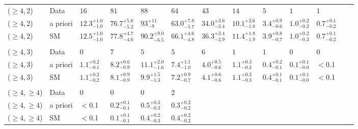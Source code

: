 \begin{table}[!t]
{\begin{tabular}{ lllllllllllll }
    ($\geq4$,\,2)
             & Data
             & $16$
             & $81$
             & $88$
             & $64$
             & $43$
             & $14$
             & $5$
             & $1$
             & $1$                                      \\
    ($\geq4$,\,2)
             & a priori
             & $12.3^{+1.0}_{-1.0}$
             & $76.7^{+5.6}_{-5.2}$
             & $93^{+11}_{-9}$
             & $63.0^{+7.8}_{-5.7}$
             & $34.0^{+3.6}_{-3.4}$
             & $10.1^{+2.6}_{-1.8}$
             & $3.4^{+0.9}_{-0.6}$
             & $1.0^{+0.2}_{-0.2}$
             & $0.7^{+0.1}_{-0.2}$                      \\
    ($\geq4$,\,2)
             & SM
             & $12.5^{+1.0}_{-1.0}$
             & $77.8^{+4.7}_{-4.6}$
             & $90.2^{+9.0}_{-6.5}$
             & $66.1^{+4.6}_{-4.8}$
             & $36.3^{+3.4}_{-2.9}$
             & $11.4^{+1.8}_{-1.9}$
             & $3.9^{+0.8}_{-0.7}$
             & $1.0^{+0.2}_{-0.3}$
             & $0.7^{+0.1}_{-0.2}$                      \\\\[-2ex]
    ($\geq4$,\,3)
             & Data
             & $0$
             & $7$
             & $5$
             & $5$
             & $6$
             & $1$
             & $1$
             & $0$
             & $0$                                      \\
    ($\geq4$,\,3)
             & a priori
             & $1.1^{+0.2}_{-0.1}$
             & $8.2^{+0.6}_{-0.9}$
             & $11.1^{+2.0}_{-1.6}$
             & $7.4^{+1.1}_{-1.0}$
             & $4.0^{+0.5}_{-0.6}$
             & $1.1^{+0.3}_{-0.3}$
             & $0.4^{+0.2}_{-0.1}$
             & $0.1^{+0.1}_{-0.0}$
             & $<$0.1                                   \\
    ($\geq4$,\,3)
             & SM
             & $1.1^{+0.2}_{-0.2}$
             & $8.1^{+0.9}_{-0.9}$
             & $9.9^{+1.5}_{-1.3}$
             & $7.2^{+0.9}_{-0.7}$
             & $4.1^{+0.6}_{-0.6}$
             & $1.1^{+0.3}_{-0.3}$
             & $0.4^{+0.1}_{-0.1}$
             & $0.1^{+0.1}_{-0.0}$
             & $<$0.1                                   \\\\[-2ex]
    ($\geq4$,\,$\geq4$)
             & Data
             & $0$
             & $0$
             & $0$
             & $2$                                      \\
    ($\geq4$,\,$\geq4$)
             & a priori 
             & $<$0.1
             & $0.2^{+0.1}_{-0.1}$
             & $0.5^{+0.3}_{-0.3}$
             & $0.3^{+0.2}_{-0.2}$                      \\
    ($\geq4$,\,$\geq4$)
             & SM
             & $<$0.1
             & $0.1^{+0.1}_{-0.1}$
             & $0.4^{+0.2}_{-0.3}$
             & $0.4^{+0.2}_{-0.2}$                      \\

    \hline
  \end{tabular}
  }
\end{table}

